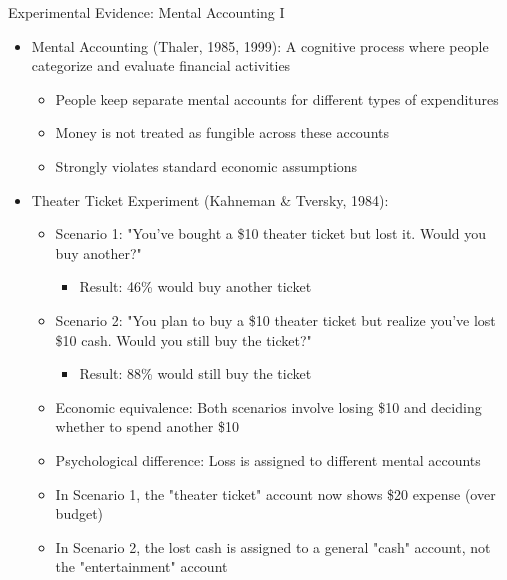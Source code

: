 \documentclass[10pt]{beamer}
\begin{document}
\begin{frame}{Experimental Evidence: Mental Accounting I}
  \begin{itemize}[<+->]
    \item Mental Accounting (Thaler, 1985, 1999): A cognitive process where people categorize and evaluate financial activities
      \begin{itemize}
        \item People keep separate mental accounts for different types of expenditures
        \item Money is not treated as fungible across these accounts
        \item Strongly violates standard economic assumptions
      \end{itemize}
    \item Theater Ticket Experiment (Kahneman \& Tversky, 1984):
      \begin{itemize}
        \item Scenario 1: "You've bought a \$10 theater ticket but lost it. Would you buy another?"
          \begin{itemize}
            \item Result: 46\% would buy another ticket
          \end{itemize}
        \item Scenario 2: "You plan to buy a \$10 theater ticket but realize you've lost \$10 cash. Would you still buy the ticket?"
          \begin{itemize}
            \item Result: 88\% would still buy the ticket
          \end{itemize}
        \item Economic equivalence: Both scenarios involve losing \$10 and deciding whether to spend another \$10
        \item Psychological difference: Loss is assigned to different mental accounts
        \item In Scenario 1, the "theater ticket" account now shows \$20 expense (over budget)
        \item In Scenario 2, the lost cash is assigned to a general "cash" account, not the "entertainment" account
      \end{itemize}
  \end{itemize}
\end{frame}
\end{document}
